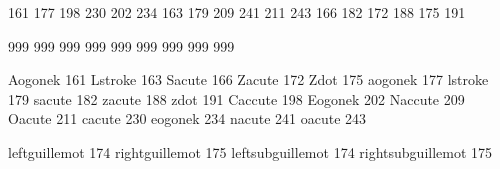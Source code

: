  161 177  %
 198 230  %
 202 234  %
 163 179  %
 209 241  %
 211 243  %
 166 182  %
 172 188  %
 175 191  %

\stopmapping 

\startmapping[pl2]

 999  %
 999  %
 999  %
 999  %
 999  %
 999  %
 999  %
 999  %
 999  %

\stopmapping 

\startencoding[pl2]

 Aogonek 161
 Lstroke 163
 Sacute  166
 Zacute  172
 Zdot    175
 aogonek 177
 lstroke 179 
 sacute  182
 zacute  188
 zdot    191
 Caccute 198
 Eogonek 202
 Naccute 209
 Oacute  211
 cacute  230
 eogonek 234
 nacute  241
 oacute  243

\stopencoding 

\startencoding[pl2]

 leftguillemot      174  %
 rightguillemot     175  %
 leftsubguillemot   174  %
 rightsubguillemot  175  %

\stopencoding

\endinput 
